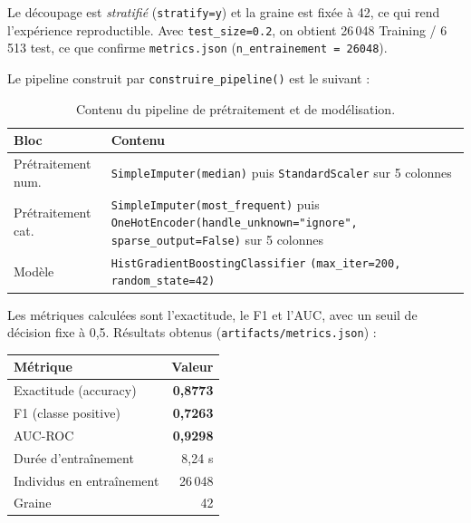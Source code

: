 \documentclass[11pt,a4paper]{report}
\newcommand{\num}[1]{\textbf{#1}}
\begin{document}
Le découpage est \emph{stratifié} (\texttt{stratify=y}) et la graine est fixée
à 42, ce qui rend l'expérience reproductible. Avec \texttt{test\_size=0.2},
on obtient 26\,048 Training / 6\,513 test, ce que confirme
\texttt{metrics.json} (\texttt{n\_entrainement = 26048}).

Le pipeline construit par \texttt{construire\_pipeline()} est le suivant :

\begin{table}[H]
\centering\small
\begin{tabular}{@{}p{3.2cm}p{12.2cm}@{}}
\toprule
\textbf{Bloc} & \textbf{Contenu} \\
\midrule
Prétraitement num. & \texttt{SimpleImputer(median)} puis \texttt{StandardScaler} sur 5 colonnes \\
Prétraitement cat.  & \texttt{SimpleImputer(most\_frequent)} puis
\newline \texttt{OneHotEncoder(handle\_unknown="ignore",}\newline
\texttt{sparse\_output=False)} sur 5 colonnes \\
Modèle            & \texttt{HistGradientBoostingClassifier}\newline
\texttt{(max\_iter=200, random\_state=42)} \\
\bottomrule
\end{tabular}
\caption{Contenu du pipeline de prétraitement et de modélisation.}
\end{table}

Les métriques calculées sont l'exactitude, le F1 et l'AUC, avec un seuil de
décision fixe à 0,5. Résultats obtenus (\texttt{artifacts/metrics.json}) :

\begin{resultat}
\begin{center}
\begin{tabular}{@{}lr@{}}
\toprule
\textbf{Métrique} & \textbf{Valeur} \\
\midrule
Exactitude (accuracy)     & \num{0,8773} \\
F1 (classe positive)      & \num{0,7263} \\
AUC-ROC                   & \num{0,9298} \\
Durée d'entraînement      & 8,24 s \\
Individus en entraînement & 26\,048 \\
Graine                    & 42 \\
\bottomrule
\end{tabular}
\end{center}
\end{resultat}
\end{document}
